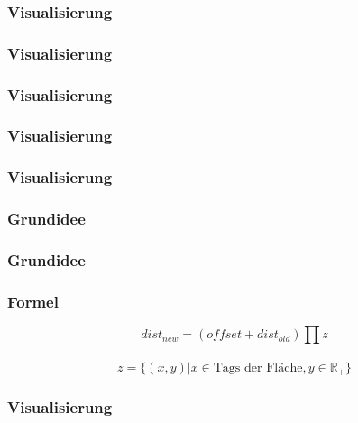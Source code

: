 \begin{frame}[fragile]
  \frametitle{Visualisierung}
  \lstset{language=XML,basicstyle=\tiny}
  
\end{frame}

\begin{frame}
  \frametitle{Visualisierung}
\end{frame}

\begin{frame}
  \frametitle{Visualisierung}
\end{frame}

\begin{frame}
  \frametitle{Visualisierung}
\end{frame}

\begin{frame}
  \frametitle{Visualisierung}
\end{frame}

\begin{frame} %
 \frametitle{Grundidee}
\end{frame}

\begin{frame} %
 \frametitle{Grundidee}
\end{frame}

\begin{frame}
  \frametitle{Formel}
  \begin{Large}
  \begin{equation*}
    dist_{new} = (offset + dist_{old}) \prod z
  \end{equation*}
  \qquad \\
\begin{equation*}
z = \{ (x,y) | x \in \text{Tags der Fl\"ache}, y \in \mathbb{R}_+\}
\end{equation*}
\end{Large}
\end{frame}

\begin{frame}
  \frametitle{Visualisierung}
\end{frame}

